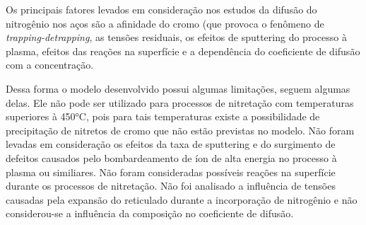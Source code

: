 Os principais fatores levados em consideração nos estudos da difusão do nitrogênio nos aços são a afinidade do cromo (que provoca o fenômeno de \textit{trapping-detrapping}, as tensões residuais, os efeitos de sputtering do processo à plasma, efeitos das reações na superfície e a dependência do coeficiente de difusão com a concentração.

Dessa forma o modelo desenvolvido possui algumas limitações, seguem algumas delas. Ele não pode ser utilizado para processos de nitretação com temperaturas superiores à 450°C, pois para tais temperaturas existe a possibilidade de precipitação de nitretos de cromo que não estão previstas no modelo. Não foram levadas em consideração os efeitos da taxa de sputtering e do surgimento de defeitos causados pelo bombardeamento de íon de alta energia no processo à plasma ou similiares. Não foram consideradas possíveis reações na superfície durante os processos de nitretação. Não foi analisado a influência de tensões causadas pela expansão do reticulado durante a incorporação de nitrogênio e não considerou-se a influência da composição no coeficiente de difusão.
